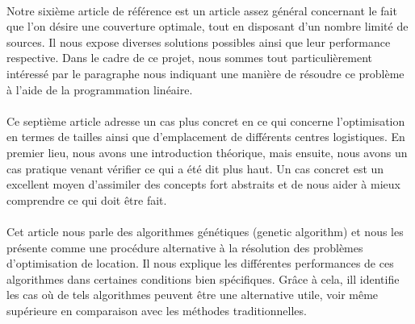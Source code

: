 \paragraph{}
Notre sixième article de référence \cite{maxcovref} est un article assez général concernant le fait que l'on désire une couverture optimale, tout en disposant d'un nombre limité de sources. Il nous expose diverses solutions possibles ainsi que leur performance respective. Dans le cadre de ce projet, nous sommes tout particulièrement intéressé par le paragraphe nous indiquant une manière de résoudre ce problème à l'aide de la programmation linéaire.

\paragraph{}
Ce septième article \cite{logisticref} adresse un cas plus concret en ce qui concerne l'optimisation en termes de tailles ainsi que d'emplacement de différents centres logistiques. En premier lieu, nous avons une introduction théorique, mais ensuite, nous avons un cas pratique venant vérifier ce qui a été dit plus haut. Un cas concret est un excellent moyen d'assimiler des concepts fort abstraits et de nous aider à mieux comprendre ce qui doit être fait.

\paragraph{}
Cet article \cite{genref} nous parle des algorithmes génétiques (genetic algorithm) et nous les présente comme une procédure alternative à la résolution des problèmes d'optimisation de location. Il nous explique les différentes performances de ces algorithmes dans certaines conditions bien spécifiques. Grâce à cela, ill identifie les cas où de tels algorithmes peuvent être une alternative utile, voir même supérieure en comparaison avec les méthodes traditionnelles.
